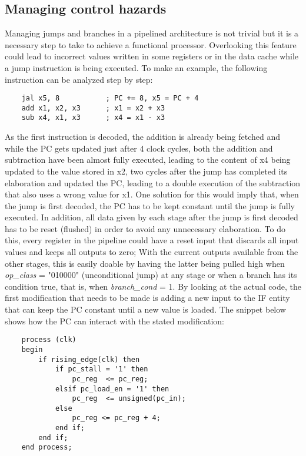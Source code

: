 \subsection{Managing control hazards}
Managing jumps and branches in a pipelined architecture is not trivial but it is a necessary step to take to achieve a functional processor. Overlooking this feature could lead to incorrect values written in some registers or in the data cache while a jump instruction is being executed. To make an example, the following instruction can be analyzed step by step:
\begin{verbatim}
    jal x5, 8           ; PC += 8, x5 = PC + 4    
    add x1, x2, x3      ; x1 = x2 + x3
    sub x4, x1, x3      ; x4 = x1 - x3
\end{verbatim}
As the first instruction is decoded, the addition is already being fetched and while the PC gets updated just after 4 clock cycles, both the addition and subtraction have been almost fully executed, leading to the content of x4 being updated to the value stored in x2, two cycles after the jump has completed its elaboration and updated the PC, leading to a double execution of the subtraction that also uses a wrong value for x1.
One solution for this would imply that, when the jump is first decoded, the PC has to be kept constant until the jump is fully executed. In addition, all data given by each stage after the jump is first decoded has to be reset (flushed) in order to avoid any unnecessary elaboration. To do this, every register in the pipeline could have a reset input that discards all input values and keeps all outputs to zero; With the current outputs available from the other stages, this is easily doable by having the latter being pulled high when \emph{op{\_}class} = "010000" (unconditional jump) at any stage or when a branch has its condition true, that is, when \emph{branch{\_}cond} = 1.
By looking at the actual code, the first modification that needs to be made is adding a new input to the IF entity that can keep the PC constant until a new value is loaded. The snippet below shows how the PC can interact with the stated modification:

\begin{verbatim}
    process (clk)
    begin
        if rising_edge(clk) then
            if pc_stall = '1' then
                pc_reg  <= pc_reg;
            elsif pc_load_en = '1' then
                pc_reg  <= unsigned(pc_in);
            else
                pc_reg <= pc_reg + 4;
            end if;
        end if;
    end process;
\end{verbatim}

